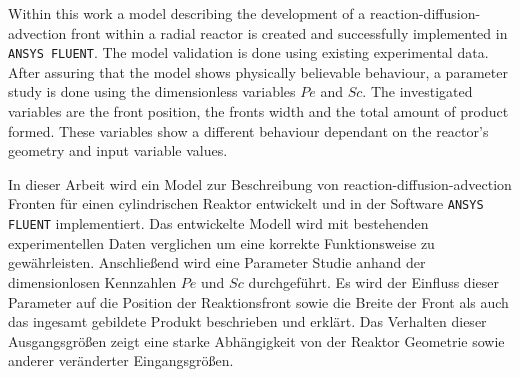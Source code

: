 \documentclass[../thesis.tex]{subfiles}
\begin{document}
\label{chp:abstract}

Within this work a model describing the development of a reaction-diffusion-advection front within a radial reactor is created and successfully implemented in \texttt{ANSYS FLUENT}. The model validation is done using existing experimental data. After assuring that the model shows physically believable behaviour, a parameter study is done using the dimensionless variables $Pe$ and $Sc$. The investigated variables are the front position, the fronts width and the total amount of product formed. These variables show a different behaviour dependant on the reactor's geometry and input variable values.
\newpage

In dieser Arbeit wird ein Model zur Beschreibung von reaction-diffusion-advection Fronten für einen cylindrischen Reaktor entwickelt und in der Software \texttt{ANSYS FLUENT} implementiert. Das entwickelte Modell wird mit bestehenden experimentellen Daten verglichen um eine korrekte Funktionsweise zu gewährleisten. Anschließend wird eine Parameter Studie anhand der dimensionlosen Kennzahlen $Pe$ und $Sc$ durchgeführt. Es wird der Einfluss dieser Parameter auf die Position der Reaktionsfront sowie die Breite der Front als auch das ingesamt gebildete Produkt beschrieben und erklärt. Das Verhalten dieser Ausgangsgrößen zeigt eine starke Abhängigkeit von der Reaktor Geometrie sowie anderer veränderter Eingangsgrößen.
\end{document}
